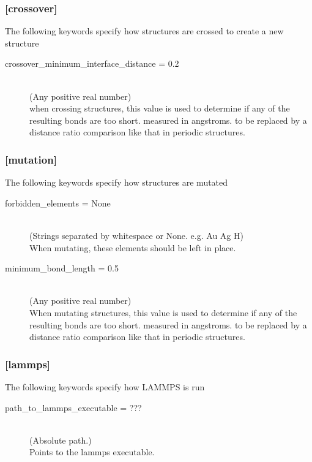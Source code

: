 \subsubsection{[crossover]}
		The following keywords specify how structures are crossed to create a new structure
\begin{description}
		\item[crossover\_minimum\_interface\_distance = 0.2]~\\
			(Any positive real number)\\
			when crossing structures, this value is used to determine if any of the resulting bonds are too short. measured in angstroms. to be replaced by a distance ratio comparison like that in periodic structures.
\end{description}

\subsubsection{[mutation]}
		The following keywords specify how structures are mutated
\begin{description}
		\item[forbidden\_elements = None]~\\
			(Strings separated by whitespace or None. e.g. Au Ag H)\\
			When mutating, these elements should be left in place.
		\item[minimum\_bond\_length = 0.5]~\\
			(Any positive real number)\\
			When mutating structures, this value is used to determine if any of the resulting bonds are too short. measured in angstroms. to be replaced by a distance ratio comparison like that in periodic structures.
\end{description}


\subsubsection{[lammps]}
		The following keywords specify how LAMMPS is run
\begin{description}
		\item[path\_to\_lammps\_executable = ???]~\\
			(Absolute path.)\\
			Points to the lammps executable.
\end{description}


